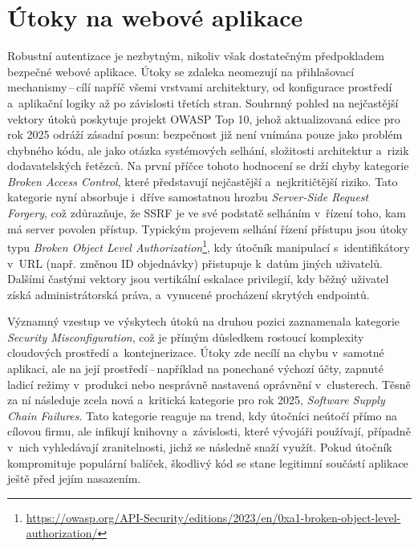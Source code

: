 \section{Útoky na webové aplikace}
Robustní autentizace je nezbytným, nikoliv však dostatečným předpokladem bezpečné webové aplikace.
Útoky se zdaleka neomezují na přihlašovací mechanismy\,--\,cílí napříč všemi vrstvami architektury, od konfigurace prostředí a~aplikační logiky až po závislosti třetích stran.
Souhrnný pohled na nejčastější vektory útoků poskytuje projekt OWASP Top 10, jehož aktualizovaná edice pro rok 2025 \cite{www-owasp-top10} odráží zásadní posun: bezpečnost již není vnímána pouze jako problém chybného kódu, ale jako otázka systémových selhání, složitosti architektur a~rizik dodavatelských řetězců.
Na první příčce tohoto hodnocení se drží chyby kategorie \emph{Broken Access Control}, které představují nejčastější a~nejkritičtější riziko.
Tato kategorie nyní absorbuje i~dříve samostatnou hrozbu \emph{Server-Side Request Forgery}, což zdůrazňuje, že SSRF je ve své podstatě selháním v~řízení toho, kam má server povolen přístup.
Typickým projevem selhání řízení přístupu jsou útoky typu \emph{Broken Object Level Authorization}\footnote{\url{https://owasp.org/API-Security/editions/2023/en/0xa1-broken-object-level-authorization/}}, kdy útočník manipulací s~identifikátory v~URL (např. změnou ID objednávky) přistupuje k~datům jiných uživatelů.
Dalšími častými vektory jsou vertikální eskalace privilegií, kdy běžný uživatel získá administrátorská práva, a~vynucené procházení skrytých endpointů.

Významný vzestup ve výskytech útoků na druhou pozici zaznamenala kategorie \emph{Security Misconfiguration}, což je přímým důsledkem rostoucí komplexity cloudových prostředí a~kontejnerizace.
Útoky zde necílí na chybu v~samotné aplikaci, ale na její prostředí\,--\,například na ponechané výchozí účty, zapnuté ladicí režimy v~produkci nebo nesprávně nastavená oprávnění v~clusterech.
Těsně za ní následuje zcela nová a~kritická kategorie pro rok 2025, \emph{Software Supply Chain Failures}.
Tato kategorie reaguje na trend, kdy útočníci neútočí přímo na cílovou firmu, ale infikují knihovny a~závislosti, které vývojáři používají, případně v~nich vyhledávají zranitelnosti, jichž se následně snaží využít.
Pokud útočník kompromituje populární balíček, škodlivý kód se stane legitimní součástí aplikace ještě před jejím nasazením.

